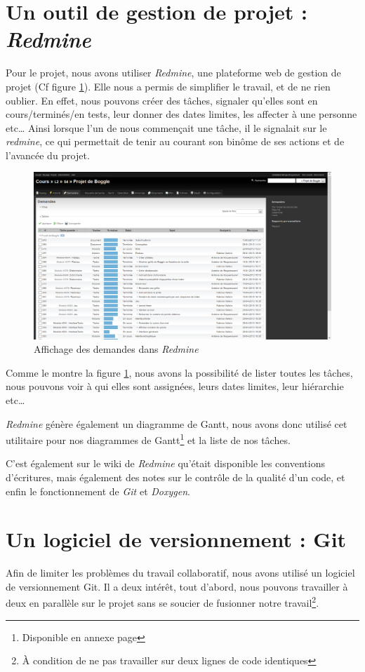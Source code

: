 \documentclass[12pt,a4paper,openany]{book}
\begin{document}
	\section{Un outil de gestion de projet : \textit{Redmine}}
	Pour le projet, nous avons utiliser \textit{Redmine}, une plateforme web de gestion de projet (Cf figure \ref{fig:redmine}). Elle nous a permis de simplifier le travail, et de ne rien oublier.
	En effet, nous pouvons créer des tâches, signaler qu'elles sont en cours/terminés/en tests, leur donner des dates limites, les affecter à une personne etc\ldots
	Ainsi lorsque l'un de nous commençait une tâche, il le signalait sur le \textit{redmine}, ce qui permettait de tenir au courant son binôme de ses actions et
	de l'avancée du projet.
	\begin{figure}[H]
		\centering
		\includegraphics[width=18cm]{screens/redmine.png}
		\caption{Affichage des demandes dans \textit{Redmine}}
		\label{fig:redmine}
	\end{figure}
	Comme le montre la figure \ref{fig:redmine}, nous avons la possibilité de lister toutes les tâches, nous pouvons voir à qui
	elles sont assignées, leurs dates limites, leur hiérarchie etc\ldots

	\textit{Redmine} génère également un diagramme de Gantt,
	nous avons donc utilisé cet utilitaire pour nos
	diagrammes de Gantt\footnote{Disponible en annexe page
	\pageref{gantt}} et
	la liste de nos tâches.

	C'est également sur le wiki de \textit{Redmine} qu'était disponible les conventions d'écritures, mais également des notes sur le
	contrôle de la qualité d'un code, et enfin le fonctionnement de \textit{Git} et \textit{Doxygen}.

	\section{Un logiciel de versionnement : Git}
	Afin de limiter les problèmes du travail collaboratif, nous avons utilisé un logiciel de versionnement Git. Il a deux intérêt, tout d'abord, nous pouvons
	travailler à deux en parallèle sur le projet sans se soucier de fusionner notre travail\footnote{À condition de ne pas travailler sur deux lignes de code identiques}.
\end{document}
